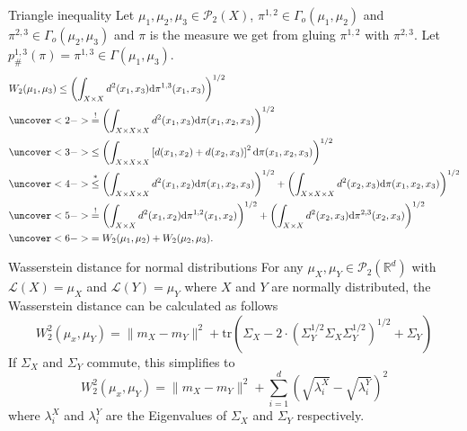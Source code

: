 \documentclass[10pt]{beamer}
\theoremstyle{reminder}
\begin{document}
\begin{frame}{Triangle inequality}
    Let $\mu_1,\mu_2,\mu_3 \in \mathcal{P}_2(X)$, $\pi^{1,2} \in \Gamma_o(\mu_1,\mu_2)$ and $\pi^{2,3} \in \Gamma_o(\mu_2,\mu_3)$ and 
    $\pi$ is the measure we get from gluing $\pi^{1,2}$ with $\pi^{2,3}$. Let $p^{1,3}_{\#}(\pi) = \pi^{1,3} \in \Gamma(\mu_1,\mu_3).$ 
    \begin{align*}&W_2(\mu_1,\mu_3) 
        \leq\left(\int_{X\times X}d^2(x_1,x_3)\mathrm{d}\pi^{1,3}(x_1,x_3)\right)^{1/2} 
        \\&\uncover<2->{\overset{!}{=}\left(\int_{X\times X\times X}d^2(x_1,x_3)\mathrm{d}\pi(x_1,x_2,x_3)\right)^{1/2}}
        \\&\uncover<3->{\leq \left(\int_{ X\times X\times X}\left[d(x_1,x_2)+d(x_2,x_3)\right]^2\mathrm{d}\pi(x_1,x_2,x_3)\right)^{1/2}}
        \\&\uncover<4->{\overset{*}{\leq}\left(\int_{X\times X \times X}d^2(x_1,x_2)\mathrm{d}\pi(x_1,x_2,x_3)\right)^{1/2}+\left(\int_{X\times X\times X}d^2(x_2,x_3)\mathrm{d}\pi(x_1,x_2,x_3)\right)^{1/2}}
        \\&\uncover<5->{\overset{!}{=}\left(\int_{X\times X}d^2(x_1,x_2)\mathrm{d}\pi^{1,2}(x_1,x_2)\right)^{1/2}+\left(\int_{X\times X}d^2(x_2,x_3)\mathrm{d}\pi^{2,3}(x_2,x_3)\right)^{1/2}}
        \\&\uncover<6->{=W_2(\mu_1,\mu_2)+W_2(\mu_2,\mu_3)}.
      \end{align*}
\end{frame}




\begin{frame}{Wasserstein distance for normal distributions}
    For any $\mu_X,\mu_Y \in \mathcal{P}_2(\mathbb{R}^d)$ with $\mathcal{L}(X) = \mu_X$ and $\mathcal{L}(Y) = \mu_Y$ where $X$ and $Y$ are normally distributed, 
    the Wasserstein distance can be calculated as follows $$W_2^2(\mu_x,\mu_Y) = \|m_X-m_Y\|^2 + \text{tr}\left(\Sigma_X-2 \cdot \left(\Sigma_Y^{1/2}\Sigma_X\Sigma_Y^{1/2}\right)^{1/2}+\Sigma_Y\right)$$
    If $\Sigma_X$ and $\Sigma_Y$ commute, this simplifies to $$W_2^2(\mu_x,\mu_Y) = \|m_X-m_Y\|^2 + \sum_{i = 1}^d \left( \sqrt{\lambda_i^X} - \sqrt{\lambda_i^Y}  \right)^2$$
    where $\lambda_i^X$ and $\lambda_i^Y$ are the Eigenvalues of $\Sigma_X$ and $\Sigma_Y$ respectively. 
\end{frame}
\end{document}
